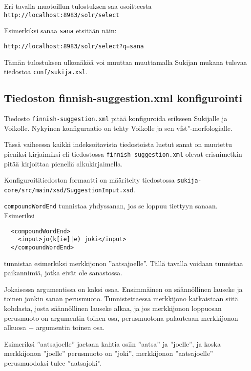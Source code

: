 \documentclass[12pt,a4paper]{scrartcl}
\begin{document}
Eri tavalla muotoillun tulostuksen saa osoitteesta \\
\verb=http://localhost:8983/solr/select=

Esimerkiksi sanaa \verb=sana= etsitään näin:

\verb|http://localhost:8983/solr/select?q=sana|

Tämän tulostuksen ulkonäköä voi muuttaa muuttamalla Sukijan mukana
tulevaa tiedostoa \verb=conf/sukija.xsl=.


\subsection*{Tiedoston finnish-suggestion.xml konfigurointi}

Tiedosto \verb|finnish-suggestion.xml| pitää konfiguroida erikseen
Sukijalle ja Voikolle. Nykyinen konfiguraatio on tehty Voikolle ja sen
vfst"-morfologialle.

Tässä vaiheessa kaikki indeksoitavista tiedostoista luetut sanat on
muutettu pieniksi kirjaimiksi eli tiedostossa
\verb|finnish-suggestion.xml| olevat erisnimetkin pitää kirjoittaa
pienellä alkukirjaimella.

Konfiguroititiedoston formaatti on määritelty tiedostossa
\verb=sukija-core/src/main/xsd/SuggestionInput.xsd=.




\verb=compoundWordEnd= tunnistaa yhdyssanan, jos se loppuu tiettyyn sanaan. Esimeriksi

\begin{verbatim}
  <compoundWordEnd>
    <input>jo(k[ie]|e) joki</input>
  </compoundWordEnd>
\end{verbatim}

tunnistaa esimerkiksi merkkijonon ''aatsajoelle''. Tällä tavalla
voidaan tunnistaa paikannimiä, jotka eivät ole sanastossa.

Jokaisessa argumentissa on kaksi osaa. Ensimmäinen on säännöllinen
lauseke ja toinen jonkin sanan perusmuoto. Tunnistettaessa merkkijono
katkaistaan siitä kohdasta, josta säännöllinen lauseke alkaa, ja jos
merkkijonon loppuosan perusmuoto on argumentin toinen osa,
perusmuotona palauteaan merkkijonon alkuosa + argumentin toinen osa.

Esimeriksi ''aatsajoelle'' jaetaan kahtia osiin ''aatsa'' ja
''joelle'', ja koska merkkijonon ''joelle'' perusmuoto on ''joki'',
merkkijonon ''aatsajoelle'' perusmuodoksi tulee ''aatsajoki''.
\end{document}
